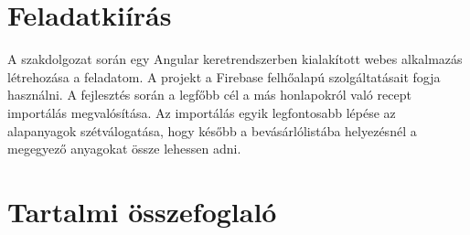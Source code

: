 \documentclass[12pt]{report}
\theoremstyle{definition}
\begin{document}
\chapter*{Feladatkiírás}

A szakdolgozat során egy Angular keretrendszerben kialakított webes alkalmazás létrehozása a feladatom. A projekt a Firebase felhőalapú szolgáltatásait fogja használni. A fejlesztés során a legfőbb cél a más honlapokról való recept importálás megvalósítása. Az importálás egyik legfontosabb lépése az alapanyagok szétválogatása, hogy később a bevásárlólistába helyezésnél a megegyező anyagokat össze lehessen adni.   

\chapter*{Tartalmi összefoglaló}
\end{document}
